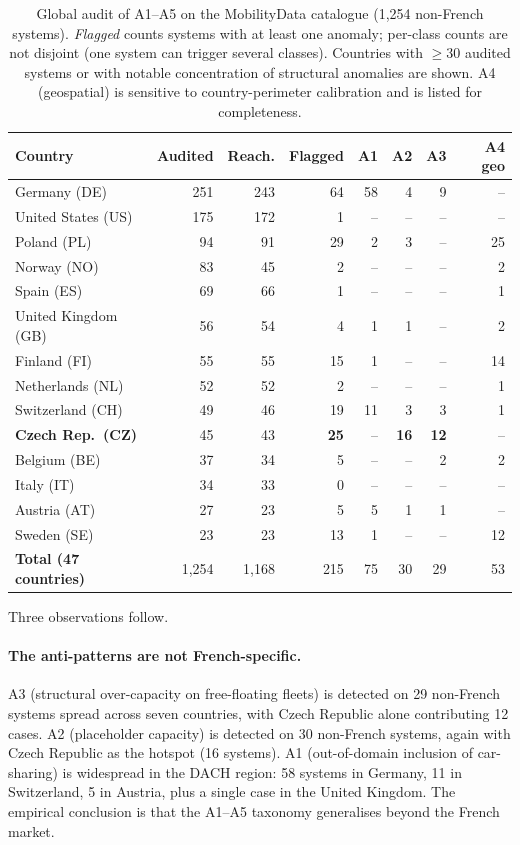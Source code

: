 \documentclass[11pt,a4paper]{article}
\begin{document}
\begin{table}[ht]
\centering
\caption{Global audit of A1--A5 on the MobilityData catalogue
(1{,}254 non-French systems). \emph{Flagged} counts systems with at
least one anomaly; per-class counts are not disjoint (one system can
trigger several classes). Countries with $\geq 30$ audited systems
or with notable concentration of structural anomalies are shown.
A4 (geospatial) is sensitive to country-perimeter calibration and is
listed for completeness.}
\label{tab:global-audit}
\small
\begin{tabular}{@{}lrrrrrrr@{}}
\toprule
\textbf{Country} & \textbf{Audited} & \textbf{Reach.} & \textbf{Flagged}
   & \textbf{A1} & \textbf{A2} & \textbf{A3} & \textbf{A4 geo}\\
\midrule
Germany (DE)        & 251 & 243 & 64 & 58 &  4 &  9 &  -- \\
United States (US)  & 175 & 172 &  1 & -- & -- & -- & --  \\
Poland (PL)         &  94 &  91 & 29 &  2 &  3 & -- & 25 \\
Norway (NO)         &  83 &  45 &  2 & -- & -- & -- &  2 \\
Spain (ES)          &  69 &  66 &  1 & -- & -- & -- &  1 \\
United Kingdom (GB) &  56 &  54 &  4 &  1 &  1 & -- &  2 \\
Finland (FI)        &  55 &  55 & 15 &  1 & -- & -- & 14 \\
Netherlands (NL)    &  52 &  52 &  2 & -- & -- & -- &  1 \\
Switzerland (CH)    &  49 &  46 & 19 & 11 &  3 &  3 &  1 \\
\textbf{Czech Rep.\ (CZ)} & 45 & 43 & \textbf{25} & -- & \textbf{16} & \textbf{12} & -- \\
Belgium (BE)        &  37 &  34 &  5 & -- & -- &  2 &  2 \\
Italy (IT)          &  34 &  33 &  0 & -- & -- & -- & -- \\
Austria (AT)        &  27 &  23 &  5 &  5 &  1 &  1 & -- \\
Sweden (SE)         &  23 &  23 & 13 &  1 & -- & -- & 12 \\
\midrule
\textbf{Total (47 countries)} & 1{,}254 & 1{,}168 & 215 & 75 & 30 & 29 & 53 \\
\bottomrule
\end{tabular}
\end{table}

Three observations follow.

\paragraph{The anti-patterns are not French-specific.}
A3 (structural over-capacity on free-floating fleets) is detected on
29 non-French systems spread across seven countries, with Czech
Republic alone contributing 12 cases. A2 (placeholder capacity) is
detected on 30 non-French systems, again with Czech Republic as the
hotspot (16 systems). A1 (out-of-domain inclusion of car-sharing) is
widespread in the DACH region: 58 systems in Germany, 11 in
Switzerland, 5 in Austria, plus a single case in the United Kingdom.
The empirical conclusion is that the A1--A5 taxonomy generalises
beyond the French market.
\end{document}
